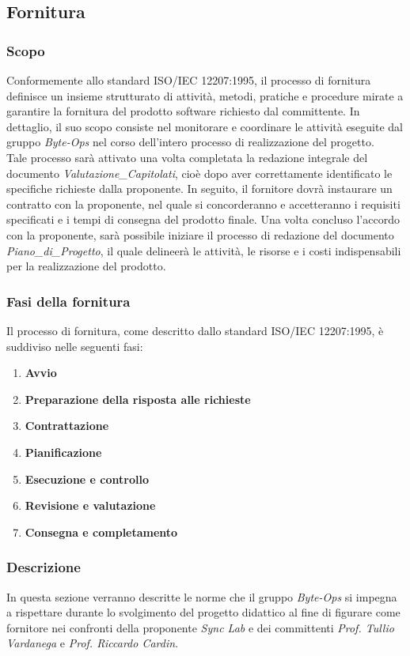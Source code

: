 \subsection{Fornitura}
\subsubsection{Scopo}
Conformemente allo standard ISO/IEC 12207:1995, il processo di fornitura definisce un insieme strutturato di attività, metodi, pratiche e procedure mirate a garantire la fornitura del prodotto software richiesto dal committente. 
In dettaglio, il suo scopo consiste nel monitorare e coordinare le attività eseguite dal gruppo \textit{Byte-Ops} nel corso dell'intero processo di realizzazione del progetto.\\
Tale processo sarà attivato una volta completata la redazione integrale del documento \textit{Valutazione\_Capitolati}, cioè dopo aver correttamente identificato le specifiche richieste dalla proponente.
In seguito, il fornitore dovrà instaurare un contratto con la proponente, nel quale si concorderanno e accetteranno i requisiti specificati e i tempi di consegna del prodotto finale. Una volta concluso l'accordo con la proponente, sarà possibile iniziare il processo di redazione del documento
\textit{Piano\_di\_Progetto}, il quale delineerà le attività, le risorse e i costi indispensabili per la realizzazione del prodotto.

\subsubsection{Fasi della fornitura}
Il processo di fornitura, come descritto dallo standard ISO/IEC 12207:1995, è suddiviso nelle seguenti fasi:
\begin{enumerate}
    \item \textbf{Avvio}
    \item \textbf{Preparazione della risposta alle richieste}
    \item \textbf{Contrattazione}
    \item \textbf{Pianificazione}
    \item \textbf{Esecuzione e controllo}
    \item \textbf{Revisione e valutazione}
    \item \textbf{Consegna e completamento}
\end{enumerate}

\subsubsection{Descrizione}
In questa sezione verranno descritte le norme che il gruppo \textit{Byte-Ops} si impegna a rispettare durante lo svolgimento del progetto didattico al fine di figurare come fornitore nei confronti della proponente \textit{Sync Lab} e dei committenti \textit{Prof. Tullio Vardanega} e \textit{Prof. Riccardo Cardin}.

